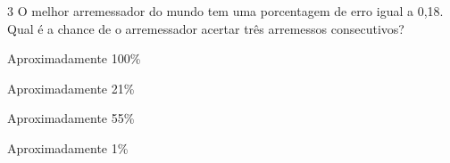 \num{3} O melhor arremessador do mundo tem uma porcentagem de erro igual a
0,18. Qual é a chance de o arremessador acertar três arremessos
consecutivos?

\begin{escolha}
\item Aproximadamente 100\%
\item Aproximadamente 21\%
\item Aproximadamente 55\%
\item Aproximadamente 1\%
\end{escolha}




